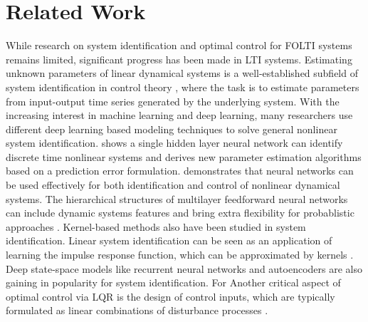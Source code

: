 \section{Related Work}
\label{relatedwork}

While research on system identification and optimal control for FOLTI systems remains limited, significant progress has been made in LTI systems. Estimating unknown parameters of linear dynamical systems is a well-established subfield of system identification in control theory \cite{JMLR:v22:19-725, faradonbeh2018finitetimeidentificationunstable, simchowitz2018learningmixingsharpanalysis}, where the task is to estimate parameters from input-output time series generated by the underlying system. With the increasing interest in machine learning and deep learning, many researchers use different deep learning based modeling techniques to solve general nonlinear system identification. \citet{chen1990non} shows a single hidden layer neural network can identify discrete time nonlinear systems and derives new parameter estimation algorithms based on a prediction error formulation. \citet{80202} demonstrates that neural networks can be used effectively for both identification and control of nonlinear dynamical systems. The hierarchical structures of multilayer feedforward neural networks can include dynamic systems features \cite{zancato2021noveldeepneuralnetwork} and bring extra flexibility for probablistic approaches \cite{hendriks2020deepenergybasednarxmodels}. Kernel-based methods also have been studied in system identification. Linear system identification can be seen as an application of learning the impulse response function, which can be approximated by kernels \cite{aronszajn1950theory,dinuzzo2012representer, cho2009kernel}. Deep state-space models \cite{gedon2021deep} like recurrent neural networks \cite{hochreiter1997long, cho2014learningphraserepresentationsusing} and autoencoders \cite{masti2021learning, lusch2018deep} are also gaining in popularity for system identification. For Another critical aspect of optimal control via LQR is the design of control inputs, which are typically formulated as linear combinations of disturbance processes \cite{dean2020sample}.
    
